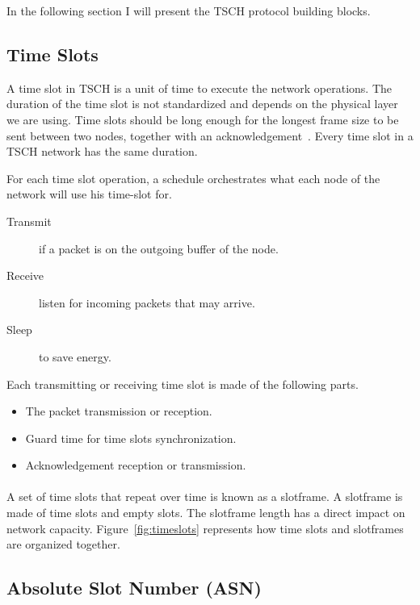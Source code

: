 In the following section I will present the TSCH protocol building blocks.

\subsection{Time Slots}

A time slot in TSCH is a unit of time to execute the network operations. 
The duration of the time slot is not standardized and depends on the physical 
layer we are using. 
Time slots should be long enough for the longest frame size to be sent
between two nodes, together with an acknowledgement~\cite{rfc7554}. 
Every time slot in a TSCH network has the same duration.

For each time slot operation, a schedule orchestrates what each
node of the network will use his time-slot for.

\begin{description}
  \item [Transmit] if a packet is on the outgoing buffer of the node.
  \item [Receive] listen for incoming packets that may arrive.
  \item [Sleep] to save energy.
\end{description}

Each transmitting or receiving time slot is made of the following parts.

\begin{itemize}
  \item The packet transmission or reception.
  \item Guard time for time slots synchronization.
  \item Acknowledgement reception or transmission.
\end{itemize}

\paragraph{}

A set of time slots that repeat over time is known as a slotframe.
A slotframe is made of time slots and empty slots.
The slotframe length has a direct impact on network capacity.
Figure~\ref{fig:timeslots} represents how time slots and slotframes are
organized together. 



\subsection{Absolute Slot Number (ASN)}

